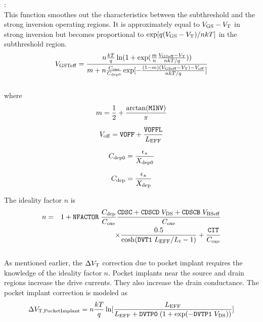 \documentclass{article}
\begin{document}
:\\
This function smoothes out the characteristics between the
subthreshold and the strong inversion operating regions. It is
approximately equal to $V_{\rm{GS}} - V_{\rm{T}}$ in strong
inversion but becomes proportional to $\exp[q(V_{\rm{GS}} -
V_{\rm{T}})/nkT]$ in the
subthreshold region. \\

\begin{equation}
V_{\rm{GSTeff}} = {n{kT \over q} \ln(1 + \exp({m \over n}
{V_{\rm{GSeff}} - V_{\rm{T}} \over nkT/q })) \over m +
n{C_{\rm{oxe}} \over C_{\rm{dep0}}} \exp[-{(1 - m)(V_{\rm{GSeff}}
- V_{\rm{T}}) - V_{\rm{off}} \over nkT/q}]}
\end {equation}
\\
where
\begin{equation}
m = {1 \over 2} + {\arctan(\texttt{MINV}) \over \pi}
\end{equation}

\begin{equation}
V_{\rm{off}} = \texttt{VOFF} + {\texttt{VOFFL} \over L_{\rm{EFF}}}
\end{equation}

\begin{equation}
C_{\rm{dep0}} = {\epsilon_s \over X_{\rm{dep0}}}
\end{equation}

\begin{equation}
C_{\rm{dep}} = {\epsilon_s \over X_{\rm{dep}}}
\end{equation}

\noindent The ideality factor $n$ is
\begin{eqnarray}
n & = & 1 + \texttt{NFACTOR}\; {C_{\rm{dep}} \over C_{\rm{oxe}}}
{\texttt{CDSC} + \texttt{CDSCD}\;V_{\rm{DS}} +
\texttt{CDSCB}\;V_{\rm{BSeff}} \over C_{\rm{oxe}}} \\
    & & \times {0.5 \over \cosh(\texttt{DVT1} \; L_{\rm{EFF}}/L_t - 1)} + {\texttt{CIT} \over C_{\rm{oxe}}}
\end{eqnarray}
\\
As mentioned earlier, the $\Delta V_{\rm{T}}$ correction due to
pocket implant requires the knowledge of the ideality factor $n$.
Pocket implants near the source and drain regions increase the
drive currents. They also increase the drain conductance. The
pocket implant correction is modeled as
\begin{equation}
\Delta V_{\rm{T,PocketImplant}} = n {kT \over q} \ln
[{L_{\rm{EFF}} \over L_{\rm{EFF}} + \texttt{DVTP0}\;(1 +
\exp(-\texttt{DVTP1}\;V_{\rm{DS}}))}]
\end{equation}
\end{document}
